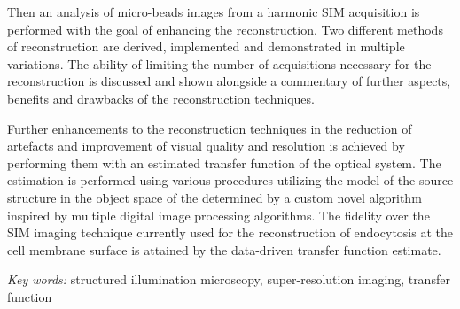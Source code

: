 Then an analysis of micro-beads images from a harmonic \ac{SIM} acquisition is performed with the goal of enhancing the
    reconstruction.
Two different methods of reconstruction are derived, implemented and demonstrated in multiple variations.
The ability of limiting the number of acquisitions necessary for the reconstruction is discussed and shown
    alongside a commentary of further aspects, benefits and drawbacks of the reconstruction techniques.

Further enhancements to the reconstruction techniques in the reduction of artefacts and improvement of visual quality
    and resolution is achieved by performing them with an estimated transfer function of the optical system.
The estimation is performed using various procedures utilizing the model of the source structure in the object space of
    the determined by a custom novel algorithm inspired by multiple digital image processing algorithms.
The fidelity over the \ac{SIM} imaging technique currently used for the reconstruction of endocytosis at the cell
    membrane surface is attained by the data-driven transfer function estimate.

\bigskip{}

\noindent \emph{Key words:} structured illumination microscopy, super-resolution imaging, transfer function








\begingroup %

